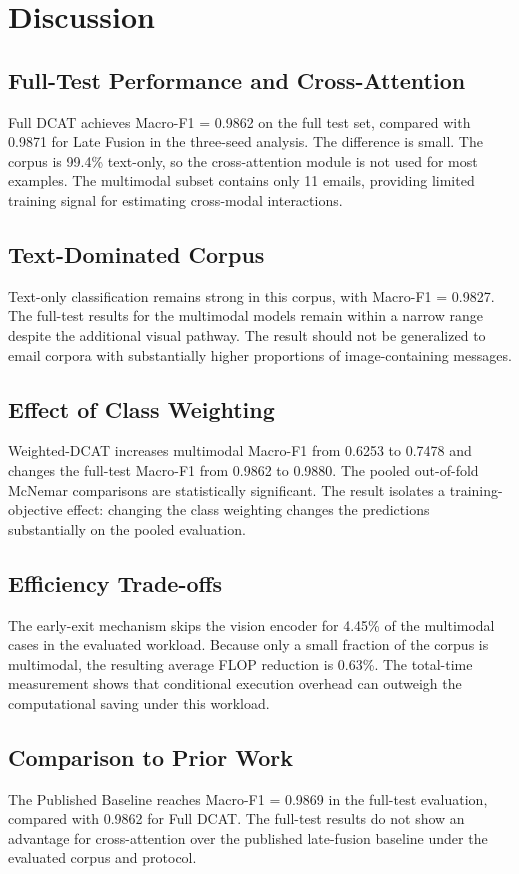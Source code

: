 \documentclass[conference]{IEEEtran}
\begin{document}
\section{Discussion}
\subsection{Full-Test Performance and Cross-Attention}
Full DCAT achieves Macro-F1 = 0.9862 on the full test set, compared with 0.9871 for Late Fusion in the three-seed analysis. The difference is small. The corpus is 99.4\% text-only, so the cross-attention module is not used for most examples. The multimodal subset contains only 11 emails, providing limited training signal for estimating cross-modal interactions.
\subsection{Text-Dominated Corpus}
Text-only classification remains strong in this corpus, with Macro-F1 = 0.9827. The full-test results for the multimodal models remain within a narrow range despite the additional visual pathway. The result should not be generalized to email corpora with substantially higher proportions of image-containing messages.
\subsection{Effect of Class Weighting}
Weighted-DCAT increases multimodal Macro-F1 from 0.6253 to 0.7478 and changes the full-test Macro-F1 from 0.9862 to 0.9880. The pooled out-of-fold McNemar comparisons are statistically significant. The result isolates a training-objective effect: changing the class weighting changes the predictions substantially on the pooled evaluation.
\subsection{Efficiency Trade-offs}
The early-exit mechanism skips the vision encoder for 4.45\% of the multimodal cases in the evaluated workload. Because only a small fraction of the corpus is multimodal, the resulting average FLOP reduction is 0.63\%. The total-time measurement shows that conditional execution overhead can outweigh the computational saving under this workload.
\subsection{Comparison to Prior Work}
The Published Baseline reaches Macro-F1 = 0.9869 in the full-test evaluation, compared with 0.9862 for Full DCAT. The full-test results do not show an advantage for cross-attention over the published late-fusion baseline under the evaluated corpus and protocol.
\end{document}
